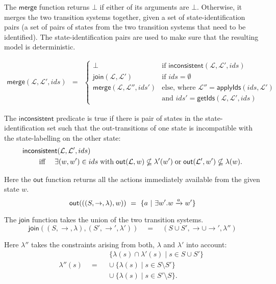 \NI The $\mathsf{merge}$ function returns $\bot$ if either of its
arguments are $\bot$. Otherwise, it merges the two transition systems
together, given a set of state-identification pairs (a set of pairs of
states from the two transition systems that need to be identified).  The
state-identification pairs are used to make sure that the resulting
model is deterministic.

\begin{eqnarray*}
  \mathsf{merge}(\mathcal{L}, \mathcal{L}', ids) 
     & = & 
  \begin{cases}
    \bot & \text{if } \mathsf{inconsistent}(\mathcal{L}, \mathcal{L}', ids)  \\
    \mathsf{join}(\mathcal{L}, \mathcal{L}') & \text{if } ids = \emptyset  \\
    \mathsf{merge}(\mathcal{L}, \mathcal{L}'', ids')  & \text{else, where }
          \mathcal{L}'' = \mathsf{applyIds}(ids, \mathcal{L}') \\
          & \text{and } ids' = \mathsf{getIds}(\mathcal{L}, \mathcal{L}', ids)
  \end{cases}
\end{eqnarray*}

\NI The $\mathsf{inconsistent}$ predicate is true if there is pair of
states in the state-identification set such that the out-transitions
of one state is incompatible with the state-labelling on the other
state:
\begin{eqnarray*}
  \lefteqn{\mathsf{inconsistent}(\mathcal{L}, \mathcal{L}', ids)}\qquad
     \\
     &\text{ iff }& \exists (w,w') \in ids \; \text{with} \; \mathsf{out}(\mathcal{L},w) \nsubseteq \lambda'(w') \; \text{or} \; \mathsf{out}(\mathcal{L}',w') \nsubseteq \lambda(w).
\end{eqnarray*}
 
\NI Here the $\mathsf{out}$ function returns all the actions
immediately available from the given state $w$.
\[
  \mathsf{out}(((S,\rightarrow,\lambda),w)) 
     \ =\  \{ a \ | \  \exists w' . w \xrightarrow{a} w'\} 
\]

\NI The $\mathsf{join}$ function takes the union of the two transition systems.
\[
   \mathsf{join}((S, \rightarrow,\lambda), (S', \rightarrow', \lambda')) 
      \quad=\quad
   (S \cup S', \rightarrow \cup \rightarrow', \lambda'')
\]

\NI Here $\lambda''$ takes the constraints arising from both, $\lambda$ and
$\lambda'$ into account: 
\[
   \lambda''(s) 
      \quad = \quad
   \begin{array}{l}
      \{\lambda(s) \cap \lambda'(s) \; | \; s \in S \cup S'\} \\ \cup \ 
      \{\lambda(s)\; |\; s\in S \setminus S' \} \\ \cup \ 
      \{\lambda(s)\; |\; s\in S' \setminus S \}. 
   \end{array}
\]


